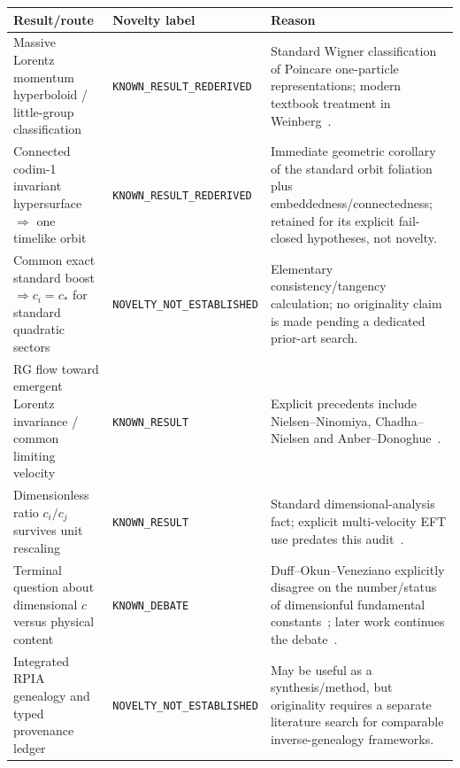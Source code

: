 \documentclass[11pt,a4paper]{article}
\begin{document}
\begin{center}
\begin{tabular}{>{\raggedright\arraybackslash}p{}>{\raggedright\arraybackslash}p{}>{\raggedright\arraybackslash}p{}}
\toprule
\textbf{Result/route} & \textbf{Novelty label} & \textbf{Reason}\\
\midrule
Massive Lorentz momentum hyperboloid / little-group classification & \texttt{KNOWN\_RESULT\_}\newline\texttt{REDERIVED} & Standard Wigner classification of Poincare one-particle representations; modern textbook treatment in Weinberg~\cite{wigner1939,weinberg1995}.\\
Connected codim-1 invariant hypersurface $\Rightarrow$ one timelike orbit & \texttt{KNOWN\_RESULT\_}\newline\texttt{REDERIVED} & Immediate geometric corollary of the standard orbit foliation plus embeddedness/connectedness; retained for its explicit fail-closed hypotheses, not novelty.\\
Common exact standard boost $\Rightarrow c_i=c_*$ for standard quadratic sectors & \texttt{NOVELTY\_NOT\_}\newline\texttt{ESTABLISHED} & Elementary consistency/tangency calculation; no originality claim is made pending a dedicated prior-art search.\\
RG flow toward emergent Lorentz invariance / common limiting velocity & \texttt{KNOWN\_RESULT} & Explicit precedents include Nielsen--Ninomiya, Chadha--Nielsen and Anber--Donoghue~\cite{nielsen1978,chadha1983,anber2011,anber2011running}.\\
Dimensionless ratio $c_i/c_j$ survives unit rescaling & \texttt{KNOWN\_RESULT} & Standard dimensional-analysis fact; explicit multi-velocity EFT use predates this audit~\cite{hermele2007}.\\
Terminal question about dimensional $c$ versus physical content & \texttt{KNOWN\_DEBATE} & Duff--Okun--Veneziano explicitly disagree on the number/status of dimensionful fundamental constants~\cite{duff2002}; later work continues the debate~\cite{matsas2007,matsas2023}.\\
Integrated RPIA genealogy and typed provenance ledger & \texttt{NOVELTY\_NOT\_}\newline\texttt{ESTABLISHED} & May be useful as a synthesis/method, but originality requires a separate literature search for comparable inverse-genealogy frameworks.\\
\bottomrule
\end{tabular}
\end{center}
\end{document}
